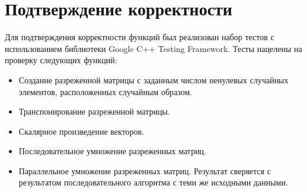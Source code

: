\documentclass{report}
\begin{document}
\section*{Подтверждение корректности}
Для подтверждения корректности функций был реализован набор тестов с использованием библиотеки Google C++ Testing Framework. Тесты нацелены на проверку следующих функций:
\begin {itemize}
	\item Создание разреженной матрицы с заданным числом ненулевых случайных элементов, расположенных случайным образом.
	\item Транспонирование разреженной матрицы.
	\item Скалярное произведение векторов.
	\item Последовательное умножение разреженных матриц.
	\item Параллельное умножение разреженных матриц. Результат сверяется с результатом последовательного алгоритма с теми же исходными данными.
\end {itemize}
\newpage
\end{document}
